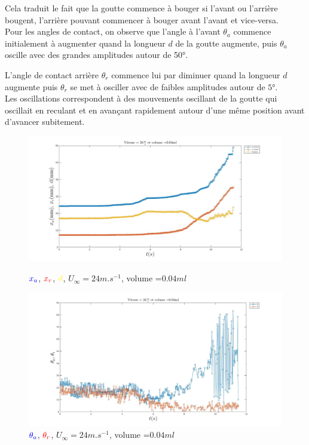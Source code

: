 Cela traduit le fait que la goutte commence à bouger si l'avant ou l'arrière bougent, l'arrière pouvant commencer à bouger avant l'avant et vice-versa.\\

Pour les angles de contact, on observe que l'angle à l'avant $\theta_{a}$ commence initialement à augmenter quand la longueur $d$ de la goutte augmente, puis $\theta_{a}$ oscille avec des grandes amplitudes autour de \ang{50}.

L'angle de contact arrière $\theta_{r}$ commence lui par diminuer quand la longueur $d$ augmente puis $\theta_{r}$ se met à osciller avec de faibles amplitudes autour de $\ang{5}$.\\

Les oscillations correspondent à des mouvements oscillant de la goutte qui oscillait en reculant et en avançant rapidement autour d'une même position avant d'avancer subitement.

\newpage
\begin{figure}[!ht]
	\centering
	\begin{minipage}{0.7\linewidth}
		\includegraphics[width=\linewidth]{./image/v=24_vol=004_xaxrd.jpg}
		\caption{$\textcolor{blue}{x_{a}}$,
		$\textcolor{red}{x_{r}}$, $\textcolor{yellow}{d}$, 
		$U_{\infty}=24m.s^{-1}$, volume =$0.04ml$}
		\label{fig:entre_xaxrd}
	\end{minipage}
	\vfill
	\begin{minipage}{0.7\linewidth}
		\includegraphics[width=\linewidth]{./image/v=24_vol=004_oaor.jpg}
		\caption{$\textcolor{blue}{\theta_{a}}$,
		$\textcolor{red}{\theta_{r}}$, $U_{\infty}=24m.s^{-1}$, volume =$0.04ml$}
		\label{fig:entre_oaor}
	\end{minipage}
 \end{figure}


